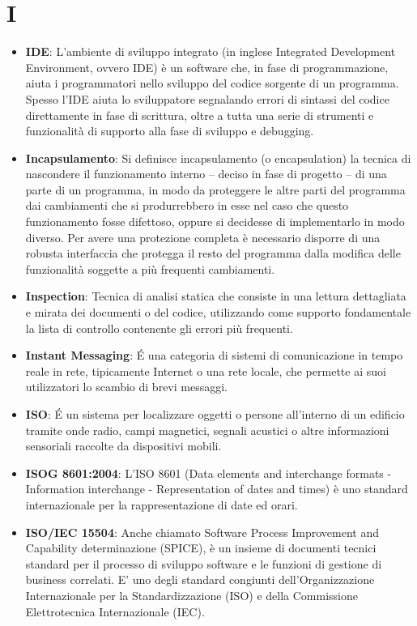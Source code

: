 \section{I}
\begin{itemize} 
	\item
	\textbf{IDE}: L’ambiente di sviluppo integrato (in inglese Integrated Development Environment, ovvero IDE) è un software che, in fase di programmazione, aiuta i programmatori nello sviluppo del codice sorgente di un programma. Spesso l’IDE aiuta lo sviluppatore segnalando errori di sintassi del codice direttamente in fase di scrittura, oltre a tutta una serie di strumenti e funzionalità di supporto alla fase di sviluppo e debugging.
	\item
	\textbf{Incapsulamento}: Si definisce incapsulamento (o encapsulation) la tecnica di nascondere il funzionamento interno – deciso in fase di progetto – di una parte di un programma, in modo da proteggere le altre parti del programma dai cambiamenti che si produrrebbero in esse nel caso che questo funzionamento fosse difettoso, oppure si decidesse di implementarlo in modo diverso. Per avere una protezione completa è necessario disporre di una robusta interfaccia che protegga il resto del programma dalla modifica delle funzionalità soggette a più frequenti cambiamenti.
	\item
	\textbf{Inspection}: Tecnica di analisi statica che consiste in una lettura dettagliata e mirata dei documenti o del codice, utilizzando come supporto fondamentale la lista di controllo contenente gli errori più frequenti.
	\item
	\textbf{Instant Messaging}: É una categoria di sistemi di comunicazione in tempo reale in rete, tipicamente Internet o una rete locale, che permette ai suoi utilizzatori lo scambio di brevi messaggi.
	\item
	\textbf{ISO}: É un sistema per localizzare oggetti o persone all'interno di un edificio tramite onde radio, campi magnetici, segnali acustici o altre informazioni sensoriali raccolte da dispositivi mobili.
	\item
	\textbf{ISOG 8601:2004}: L'ISO 8601 (Data elements and interchange formats - Information interchange - Representation of dates and times) è uno standard internazionale per la rappresentazione di date ed orari.
	\item
	\textbf{ISO/IEC 15504}: Anche chiamato Software Process Improvement and Capability determinazione (SPICE), è un insieme di documenti tecnici standard per il processo di sviluppo software e le funzioni di gestione di business correlati. E' uno degli standard congiunti dell'Organizzazione Internazionale per la Standardizzazione (ISO) e della Commissione Elettrotecnica Internazionale (IEC).

\end{itemize}
